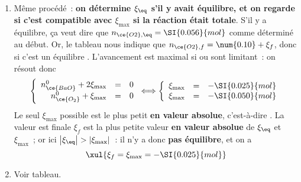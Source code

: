 \documentclass[../../main/main.tex]{subfiles}
\begin{document}
{\begin{enumerate}[leftmargin=20pt, label=\alph* --]
\begin{tcb}
		      \end{tcb}
		\item Même procédé~: \textbf{on détermine $\xi_{\eq}$ s'il y
			      avait équilibre, et on regarde si c'est compatible avec
			      $\xi_{\max}$ si la réaction était totale}.
            \bigbreak
		      S'il y a équilibre, ça veut dire que $n_{\ce{O2}, \eq} =
			      \SI{0.056}{mol}$ comme déterminé au début. Or, le tableau nous
		      indique que $n_{\ce{O2}, f} = \num{0.10} + \xi_f$, donc si c'est
		      un équilibre .
          \bigbreak
		      L'avancement est maximal si  ou  sont limitant~:
		      on résout donc
		      \begin{gather*}
			      \left\{
			      \begin{array}{rcl}
				      n_{\ce{BaO}}^{0}+2\xi_{\max} & = & 0 \\
				      n_{\ce{O_2}}^{0}+\xi_{\max}  & = & 0
			      \end{array}
			      \right.
			      \Longleftrightarrow
			      \left\{
			      \begin{array}{rcl}
				      \xi_{\max} & = & -\SI{0.025}{mol} \\
				      \xi_{\max} & = & -\SI{0.050}{mol}
			      \end{array}
			      \right.
		      \end{gather*}
		      Le seul $\xi_{\max}$ possible est le plus petit \textbf{en
			      valeur absolue}, c'est-à-dire .
              \bigbreak
          La valeur est finale $\xi_f$ est la plus petite valeur \textbf{en
          valeur absolue} de $\xi_{\eq}$ et $\xi_{\max}$~; or ici
          $\abs{\xi_{\eq}} > \abs{\xi_{\max}}$~: il n'y a donc \textbf{pas
          équilibre}, et on a
		      \[\xul{\xi_f = \xi_{\max} = -\SI{0.025}{mol}}\]
		\item Voir tableau.
	\end{enumerate}
}
\end{document}
